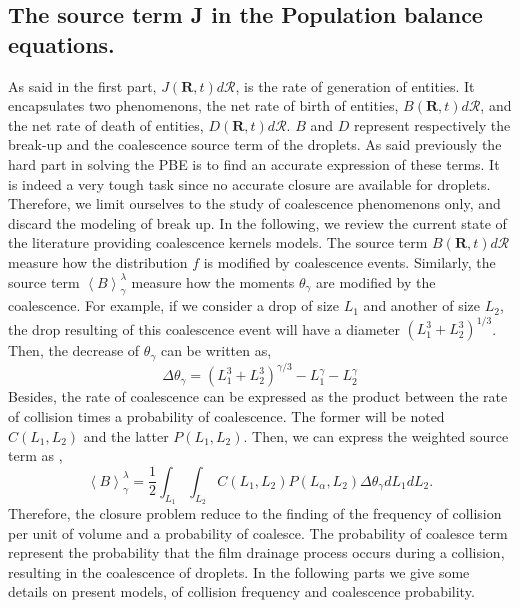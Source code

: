 \subsection{The source term J in the Population balance equations.}
As said in the first part, $J(\mathcal{\bm{R}},t)d\mathcal{R}$, is the rate of generation of entities. 
It encapsulates two phenomenons, the net rate of birth of entities, $B(\mathcal{\bm{R}},t)d\mathcal{R}$, and the net rate of death of entities, $D(\mathcal{\bm{R}},t)d\mathcal{R}$.
$B$ and $D$ represent respectively the break-up and the coalescence source term of the droplets. 
As said previously the hard part in solving the PBE is to find an accurate expression of these terms. 
It is indeed a very tough task since no accurate closure are available for droplets. 
Therefore, we limit ourselves to the study of coalescence phenomenons only, and discard the modeling of break up. 
In the following, we review the current state of the literature providing coalescence kernels models.  
The source term $B(\mathcal{\bm{R}},t)d\mathcal{R}$ measure how the distribution $f$ is modified by coalescence events.
Similarly, the source term $\left<B\right>^\lambda_\gamma$ measure how the moments $\theta_\gamma$ are modified by the coalescence. 
For example, if we consider a drop of size $L_1$ and another of size $L_2$, the drop resulting of this coalescence event will have a diameter $(L_1^3 + L_2^3)^{1/3}$. 
Then, the decrease of $\theta_\gamma$ can be written as, 
\begin{equation}
    \Delta \theta_\gamma 
    = (L_1^3 + L_2^3)^{\gamma/3} -L_1^\gamma - L_2^\gamma
\end{equation}
Besides, the rate of coalescence can be expressed as the product between the rate of collision times a probability of coalescence. 
The former will be noted $C(L_1,L_2)$ and the latter $P(L_1,L_2)$. 
Then, we can express the weighted source term as \citep{KAMP20011363}, 
\begin{equation}
    \left<B\right>^\lambda_\gamma = \frac{1}{2}\int_{L_1}\int_{L_2} C(L_1,L_2)P(L_\alpha,L_2) \Delta \theta_\gamma dL_1 dL_2.
    \label{eq:cockerel}
\end{equation}
Therefore, the closure problem reduce to the finding of the frequency of collision per unit of volume and a probability of coalesce. 
The probability of coalesce term represent the probability that the film drainage process occurs during a collision, resulting in the coalescence of droplets. 
In the following parts we give some details on present models, of collision frequency and coalescence probability.

